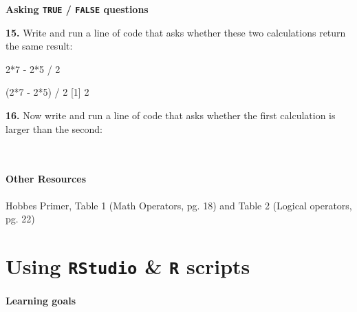 \documentclass[
]{book}
\newenvironment{Shaded}{\begin{snugshade}}{\end{snugshade}}
\newcommand{\DecValTok}[1]{\textcolor[rgb]{0.00,0.00,0.81}{#1}}
\newcommand{\NormalTok}[1]{#1}
\newcommand{\SpecialCharTok}[1]{\textcolor[rgb]{0.00,0.00,0.00}{#1}}
\begin{document}
\textbf{Asking \texttt{TRUE} / \texttt{FALSE} questions}

\textbf{15.} Write and run a line of code that asks whether these two calculations return the same result:

\begin{Shaded}
\begin{Highlighting}[]
\DecValTok{2}\SpecialCharTok{*}\DecValTok{7} \SpecialCharTok{{-}} \DecValTok{2}\SpecialCharTok{*}\DecValTok{5} \SpecialCharTok{/} \DecValTok{2}
\end{Highlighting}
\end{Shaded}

\begin{Shaded}
\begin{Highlighting}[]
\NormalTok{(}\DecValTok{2}\SpecialCharTok{*}\DecValTok{7} \SpecialCharTok{{-}} \DecValTok{2}\SpecialCharTok{*}\DecValTok{5}\NormalTok{) }\SpecialCharTok{/} \DecValTok{2}
\NormalTok{[}\DecValTok{1}\NormalTok{] }\DecValTok{2}
\end{Highlighting}
\end{Shaded}

\textbf{16.} Now write and run a line of code that asks whether the first calculation is larger than the second:

~

\hypertarget{other-resources}{%
\subsubsection*{Other Resources}\label{other-resources}}

Hobbes Primer, Table 1 (Math Operators, pg. 18) and Table 2 (Logical operators, pg. 22)

\hypertarget{using-rstudio-r-scripts}{%
\chapter{\texorpdfstring{Using \texttt{RStudio} \& \texttt{R} scripts}{Using RStudio \& R scripts}}\label{using-rstudio-r-scripts}}

\hypertarget{learning-goals-1}{%
\subsubsection*{Learning goals}\label{learning-goals-1}}
\end{document}
